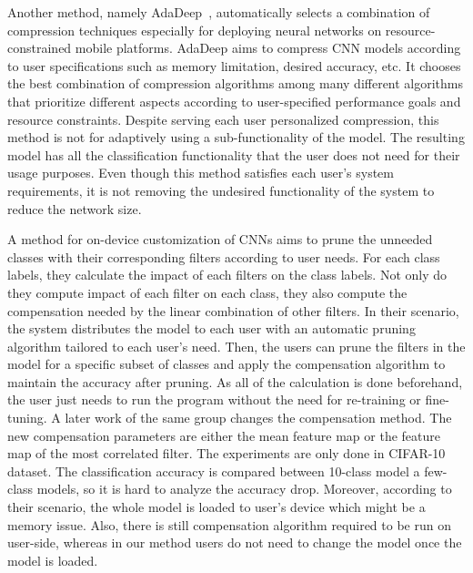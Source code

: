 Another method, namely AdaDeep~\cite{Liu2018OnDemandDM}, automatically selects a combination of compression techniques especially for deploying neural networks on resource-constrained mobile platforms. 
AdaDeep aims to compress CNN models according to user specifications such as memory limitation, desired accuracy, etc. 
It chooses the best combination of compression algorithms among many different algorithms that prioritize different aspects according to user-specified performance goals and resource constraints. 
Despite serving each user personalized compression, this method is not for adaptively using a sub-functionality of the model.
The resulting model has all the classification functionality that the user does not need for their usage purposes. 
Even though this method satisfies each user's system requirements, it is not removing the undesired functionality of the system to reduce the network size.

A method for on-device customization of CNNs\cite{guo2017pruning2} aims to prune the unneeded classes with their corresponding filters according to user needs. 
For each class labels, they calculate the impact of each filters on the class labels. 
Not only do they compute impact of each filter on each class, they also compute the compensation needed by the linear combination of other filters.
In their scenario, the system distributes the model to each user with an automatic pruning algorithm tailored to each user's need. 
Then, the users can prune the filters in the model for a specific subset of classes and apply the compensation algorithm to maintain the accuracy after pruning. 
As all of the calculation is done beforehand, the user just needs to run the program without the need for re-training or fine-tuning.
A later work of the same group\cite{guo2017pruning} changes the compensation method.
The new compensation parameters are either the mean feature map or the feature map of the most correlated filter.
The experiments are only done in CIFAR-10 dataset. The classification accuracy is compared between 10-class model a few-class models, so it is hard to analyze the accuracy drop.
Moreover, according to their scenario, the whole model is loaded to user's device which might be a memory issue.
Also, there is still compensation algorithm required to be run on user-side, whereas in our method users do not need to change the model once the model is loaded.

